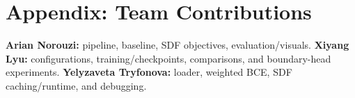\documentclass[10pt,twocolumn,letterpaper]{article}
\begin{document}
\section*{Appendix: Team Contributions}
\textbf{Arian Norouzi:} pipeline, baseline, SDF objectives, evaluation/visuals. \textbf{Xiyang Lyu:} configurations, training/checkpoints, comparisons, and boundary-head experiments. \textbf{Yelyzaveta Tryfonova:} loader, weighted BCE, SDF caching/runtime, and debugging.

\clearpage
{\small


}
\end{document}
